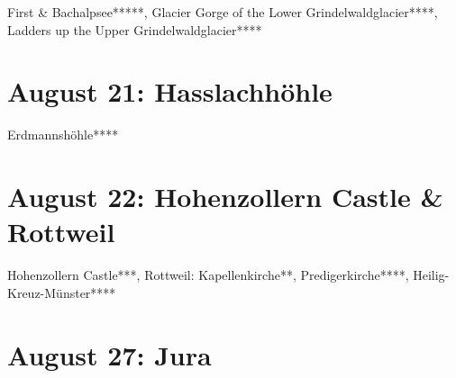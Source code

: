 First \& Bachalpsee*****, Glacier Gorge of the Lower Grindelwaldglacier****, Ladders up the Upper Grindelwaldglacier****

\section{August 21: Hasslachh\"ohle}
\label{2010Hasslach}

Erdmannsh\"ohle****

\section{August 22: Hohenzollern Castle \& Rottweil}
\label{2010Hohenzollern}

Hohenzollern Castle***, Rottweil: Kapellenkirche**, Predigerkirche****, Heilig-Kreuz-M\"unster****

\section{August 27: Jura}
\label{jura2010}

